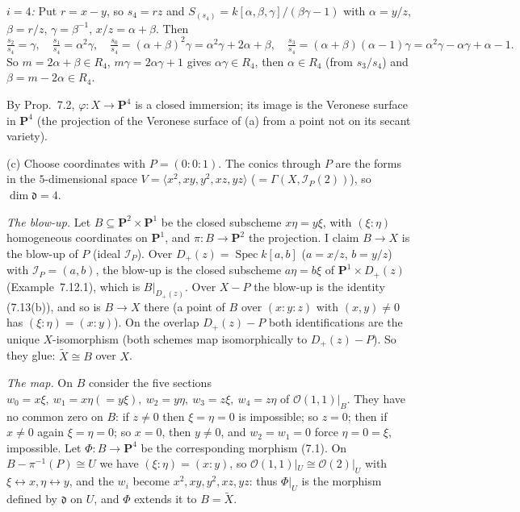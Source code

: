 \documentclass[11pt]{article}
\begin{document}
\emph{$i=4$:} Put $r=x-y$, so $s_4=rz$ and $S_{(s_4)}=k[\alpha,\beta,\gamma]/(\beta\gamma-1)$ with $\alpha=y/z$, $\beta=r/z$, $\gamma=\beta^{-1}$, $x/z=\alpha+\beta$. Then
\[
\tfrac{s_2}{s_4}=\gamma,\quad\tfrac{s_1}{s_4}=\alpha^2\gamma,\quad\tfrac{s_0}{s_4}=(\alpha+\beta)^2\gamma=\alpha^2\gamma+2\alpha+\beta,\quad \tfrac{s_3}{s_4}=(\alpha+\beta)(\alpha-1)\gamma=\alpha^2\gamma-\alpha\gamma+\alpha-1 .
\]
So $m=2\alpha+\beta\in R_4$, $m\gamma=2\alpha\gamma+1$ gives $\alpha\gamma\in R_4$, then $\alpha\in R_4$ (from $s_3/s_4$) and $\beta=m-2\alpha\in R_4$.

By Prop.~7.2, $\varphi:X\to\mathbf P^4$ is a closed immersion; its image is the Veronese surface in $\mathbf P^4$ (the projection of the Veronese surface of (a) from a point not on its secant variety).

(c) Choose coordinates with $P=(0:0:1)$. The conics through $P$ are the forms in the $5$-dimensional space $V=\langle x^2,xy,y^2,xz,yz\rangle$ ($=\Gamma(X,\mathcal I_P(2))$), so $\dim\mathfrak d=4$.

\emph{The blow-up.} Let $B\subseteq\mathbf P^2\times\mathbf P^1$ be the closed subscheme $x\eta=y\xi$, with $(\xi:\eta)$ homogeneous coordinates on $\mathbf P^1$, and $\pi:B\to\mathbf P^2$ the projection. I claim $B\to X$ is the blow-up of $P$ (ideal $\mathcal I_P$). Over $D_+(z)=\operatorname{Spec}k[a,b]$ ($a=x/z$, $b=y/z$) with $\mathcal I_P=(a,b)$, the blow-up is the closed subscheme $a\eta=b\xi$ of $\mathbf P^1\times D_+(z)$ (Example~7.12.1), which is $B|_{D_+(z)}$. Over $X-P$ the blow-up is the identity (7.13(b)), and so is $B\to X$ there (a point of $B$ over $(x:y:z)$ with $(x,y)\ne0$ has $(\xi:\eta)=(x:y)$). On the overlap $D_+(z)-P$ both identifications are the unique $X$-isomorphism (both schemes map isomorphically to $D_+(z)-P$). So they glue: $\tilde X\cong B$ over $X$.

\emph{The map.} On $B$ consider the five sections $w_0=x\xi,\ w_1=x\eta(=y\xi),\ w_2=y\eta,\ w_3=z\xi,\ w_4=z\eta$ of $\mathcal O(1,1)|_B$. They have no common zero on $B$: if $z\ne0$ then $\xi=\eta=0$ is impossible; so $z=0$; then if $x\ne0$ again $\xi=\eta=0$; so $x=0$, then $y\ne0$, and $w_2=w_1=0$ force $\eta=0=\xi$, impossible. Let $\Phi:B\to\mathbf P^4$ be the corresponding morphism (7.1). On $B-\pi^{-1}(P)\cong U$ we have $(\xi:\eta)=(x:y)$, so $\mathcal O(1,1)|_U\cong\mathcal O(2)|_U$ with $\xi\leftrightarrow x,\eta\leftrightarrow y$, and the $w_i$ become $x^2,xy,y^2,xz,yz$: thus $\Phi|_U$ is the morphism defined by $\mathfrak d$ on $U$, and $\Phi$ extends it to $B=\tilde X$.
\end{document}
